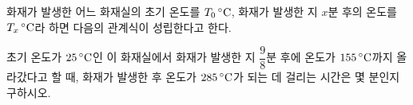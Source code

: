 화재가 발생한 어느 화재실의 초기 온도를 $T_0\mkern3mu ^{\circ}\mathrm{C}$, 화재가 발생한 지 $x$분 후의 온도를 $T_x\mkern3mu ^{\circ}\mathrm{C}$라 하면 다음의 관계식이 성립한다고 한다.\par\smallskip{}\par\smallskip\noindent 초기 온도가 $25\mkern3mu ^{\circ}\mathrm{C}$인 이 화재실에서 화재가 발생한 지 $\dfrac{9}{8}$분 후에 온도가 $155\mkern3mu ^{\circ}\mathrm{C}$까지 올라갔다고 할 때, 화재가 발생한 후 온도가 $285\mkern3mu ^{\circ}\mathrm{C}$가 되는 데 걸리는 시간은 몇 분인지 구하시오.
